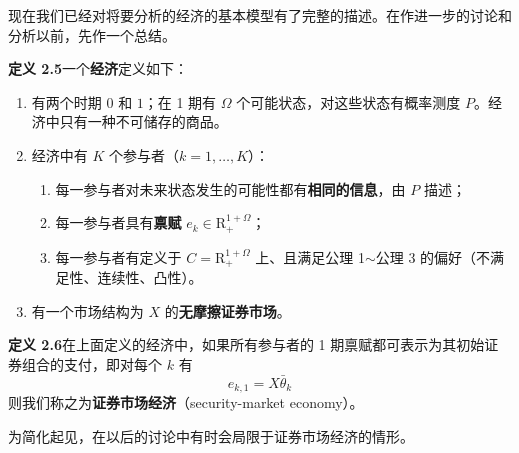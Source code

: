 \begin{tcolorbox}[knowledge,title=2.4 基本经济模型]
现在我们已经对将要分析的经济的基本模型有了完整的描述。在作进一步的讨论和分析以前，先作一个总结。

\begin{tcolorbox}[knowledge]
\textbf{定义 2.5}\quad 一个\textbf{经济}定义如下：
\begin{enumerate}
    \item 有两个时期 $0$ 和 $1$；在 1 期有 $\Omega$ 个可能状态，对这些状态有概率测度 $P$。经济中只有一种不可储存的商品。
    \item 经济中有 $K$ 个参与者（$k=1,\dots,K$）：
    \begin{enumerate}[label=(\alph*)]
        \item 每一参与者对未来状态发生的可能性都有\textbf{相同的信息}，由 $P$ 描述；
        \item 每一参与者具有\textbf{禀赋} $e_k\in\mathrm{R}^{1+\Omega}_{+}$；
        \item 每一参与者有定义于 $C=\mathrm{R}^{1+\Omega}_{+}$ 上、且满足公理 1$\sim$公理 3 的偏好（不满足性、连续性、凸性）。
    \end{enumerate}
    \item 有一个市场结构为 $X$ 的\textbf{无摩擦证券市场}。
\end{enumerate}
\end{tcolorbox}

\begin{tcolorbox}[knowledge]
\textbf{定义 2.6}\quad 在上面定义的经济中，如果所有参与者的 1 期禀赋都可表示为其初始证券组合的支付，即对每个 $k$ 有 
\[
e_{k,1}=X\bar{\theta}_k
\]
则我们称之为\textbf{证券市场经济}（security-market economy）。
\end{tcolorbox}

为简化起见，在以后的讨论中有时会局限于证券市场经济的情形。
\end{tcolorbox}

